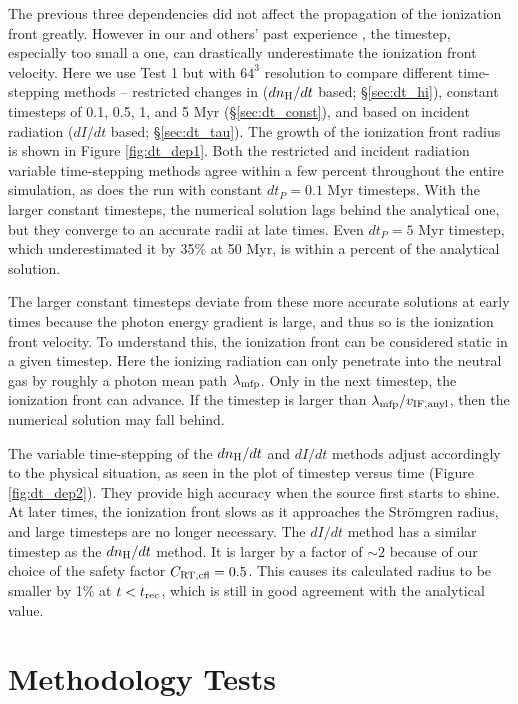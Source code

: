 \documentclass[useAMS,usenatbib]{mn2e}
\begin{document}
The previous three dependencies did not affect the propagation of the
ionization front greatly.  However in our and others' past experience
\citep[e.g.][]{Shapiro04, Mellema06, Petkova09}, the timestep,
especially too small a one, can drastically underestimate the
ionization front velocity.  Here we use Test 1 but with $64^3$
resolution to compare different time-stepping methods -- restricted
changes in \hii ($dn_{\rm H}/dt$ based; \S\ref{sec:dt_hi}),
constant timesteps of 0.1, 0.5, 1, and 5 Myr (\S\ref{sec:dt_const}),
and based on incident radiation ($dI/dt$ based; \S\ref{sec:dt_tau}).
The growth of the ionization front radius is shown in Figure
\ref{fig:dt_dep1}.  Both the \hii restricted and incident
radiation variable time-stepping methods agree within a few percent
throughout the entire simulation, as does the run with constant $dt_P
= 0.1$ Myr timesteps.  With the larger constant timesteps, the
numerical solution lags behind the analytical one, but they converge
to an accurate \hii radii at late times.  Even $dt_P = 5$ Myr
timestep, which underestimated it by 35\% at 50 Myr, is within a
percent of the analytical solution.

The larger constant timesteps deviate from these more accurate
solutions at early times because the photon energy gradient is large,
and thus so is the ionization front velocity.  To understand this, the
ionization front can be considered static in a given timestep.  Here
the ionizing radiation can only penetrate into the neutral gas by
roughly a photon mean path $\lambda_{\rm mfp}$.  Only in the next
timestep, the ionization front can advance.  If the timestep is larger
than $\lambda_{\rm mfp} / v_{\rm IF, anyl}$, then the numerical
solution may fall behind.

The variable time-stepping of the $dn_{\rm H}/dt$ and $dI/dt$ methods
adjust accordingly to the physical situation, as seen in the plot of
timestep versus time (Figure \ref{fig:dt_dep2}).  They provide high
accuracy when the source first starts to shine.  At later times, the
ionization front slows as it approaches the Str\"{o}mgren radius, and
large timesteps are no longer necessary.  The $dI/dt$ method has a
similar timestep as the $dn_{\rm H}/dt$ method.  It is larger by a
factor of $\sim 2$ because of our choice of the safety factor $C_{\rm
  RT, cfl} = 0.5$.  This causes its calculated radius to be smaller by
1\% at $t < t_{\rm rec}$, which is still in good agreement with the
analytical value.

\section{Methodology Tests}
\end{document}
